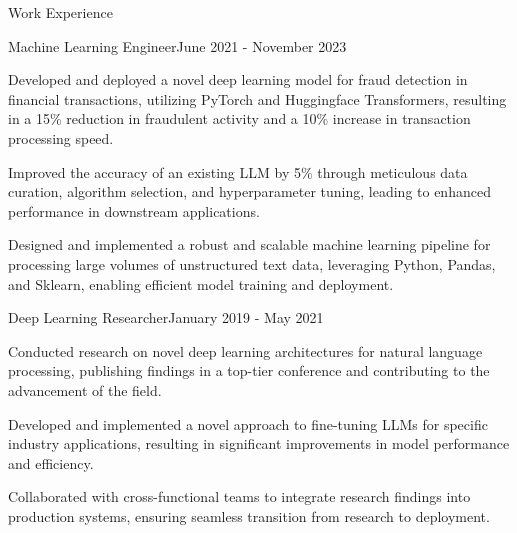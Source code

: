\documentclass{resume} %
\begin{document}
    \begin{rSection}{Work Experience}
                    \begin{rSubsection}
                {Machine Learning Engineer}{June 2021 - November 2023}
                                    {}
                                {}
                                    \item Developed and deployed a novel deep learning model for fraud detection in financial transactions, utilizing PyTorch and Huggingface Transformers, resulting in a 15\% reduction in fraudulent activity and a 10\% increase in transaction processing speed.
                                    \item Improved the accuracy of an existing LLM by 5\% through meticulous data curation, algorithm selection, and hyperparameter tuning, leading to enhanced performance in downstream applications.
                                    \item Designed and implemented a robust and scalable machine learning pipeline for processing large volumes of unstructured text data, leveraging Python, Pandas, and Sklearn, enabling efficient model training and deployment.
                            \end{rSubsection}
                    \begin{rSubsection}
                {Deep Learning Researcher}{January 2019 - May 2021}
                                    {}
                                {}
                                    \item Conducted research on novel deep learning architectures for natural language processing, publishing findings in a top-tier conference and contributing to the advancement of the field.
                                    \item Developed and implemented a novel approach to fine-tuning LLMs for specific industry applications, resulting in significant improvements in model performance and efficiency.
                                    \item Collaborated with cross-functional teams to integrate research findings into production systems, ensuring seamless transition from research to deployment.
                            \end{rSubsection}
                    \begin{rSubsection}

\end{rSubsection}
\end{rSection}
\end{document}
